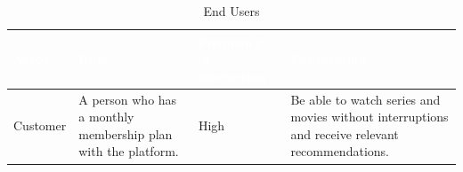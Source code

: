 \documentclass{article}
\begin{document}
\begin{table}[H]

\centering

\small

\renewcommand{\arraystretch}{1.35}

\caption{End Users}

\label{tab:end_users}

\begin{tabularx}{\textwidth}{|p{2.8cm}|X|p{2.8cm}|X|}

\hline

\rowcolor[HTML]{1F2937}

\textcolor{white}{\textbf{Actor}} &
\textcolor{white}{\textbf{Role}} &
\textcolor{white}{\textbf{Frequency of interaction}} &
\textcolor{white}{\textbf{Expectation}} \\

\hline

Customer
&
A person who has a monthly membership plan with the platform.
&
High
&
Be able to watch series and movies without interruptions and receive relevant recommendations.

\\

\hline

\end{tabularx}

\end{table}
\end{document}
